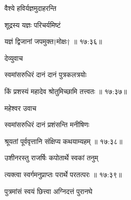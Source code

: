 \nemslokab

{\devanagarifont वैश्ये हविर्यज्ञमुदाहरन्ति  \danda\dontdisplaylinenum }%

\nemslokac

{\devanagarifont शूद्रस्य यज्ञः परिचर्यमिष्टं }%
  \dontdisplaylinenum


\nemslokad

{\devanagarifont यज्ञं द्विजानां जपमुक्त†मोक्षः† {॥ १७:३६॥} \veg\dontdisplaylinenum }%
 

\vers


{\devanagarifont देव्युवाच {\dandab}\dontdisplaylinenum  }%
 
{\devanagarifont स्वमांसरुधिरं दानं दानं पुत्रकलत्रयोः \thinspace{\danda} \dontdisplaylinenum }%
 

{\devanagarifont किं प्रशस्यं महादेव श्रोतुमिच्छामि तत्त्वतः {॥ १७:३७॥} \veg\dontdisplaylinenum }%
  
{\devanagarifont महेश्वर उवाच {\dandab}\dontdisplaylinenum  }%

{\devanagarifont स्वमांसरुधिरं दानं प्रशंसन्ति मनीषिणः \thinspace{\danda} \dontdisplaylinenum }%
 

{\devanagarifont श्रूयतां पूर्ववृत्तानि संक्षिप्य कथयाम्यहम् {॥ १७:३८॥} \veg\dontdisplaylinenum }%
 
{\devanagarifont उशीनरस्तु राजर्षिः कपोतार्थे स्वकां तनुम् \thinspace{\dandab} \dontdisplaylinenum }%


{\devanagarifont त्यक्त्वा स्वर्गमनुप्राप्तः परार्थे परतत्परः {॥ १७:३९॥} \veg\dontdisplaylinenum }%
 
{\devanagarifont पुत्रमांसं स्वयं छित्त्वा अग्निदत्तं पुरानघे \thinspace{\dandab} \dontdisplaylinenum }%

